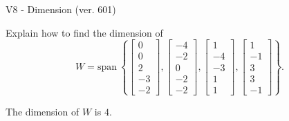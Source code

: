 \begin{exercise}
  \begin{exerciseTitle}V8 - Dimension (ver. 601)\end{exerciseTitle}
  \begin{exerciseStatement}
    Explain how to find the dimension of 
\[W=\mathrm{span}\ \left\{\left[\begin{array}{r}
0 \\
0 \\
2 \\
-3 \\
-2
\end{array}\right] , \left[\begin{array}{r}
-4 \\
-2 \\
0 \\
-2 \\
-2
\end{array}\right] , \left[\begin{array}{r}
1 \\
-4 \\
-3 \\
1 \\
1
\end{array}\right] , \left[\begin{array}{r}
1 \\
-1 \\
3 \\
3 \\
-1
\end{array}\right]\right\}.\]



  \end{exerciseStatement}
  \begin{exerciseAnswer}
   The dimension of \(W\) is  \(4\).
  


  \end{exerciseAnswer}
\end{exercise}